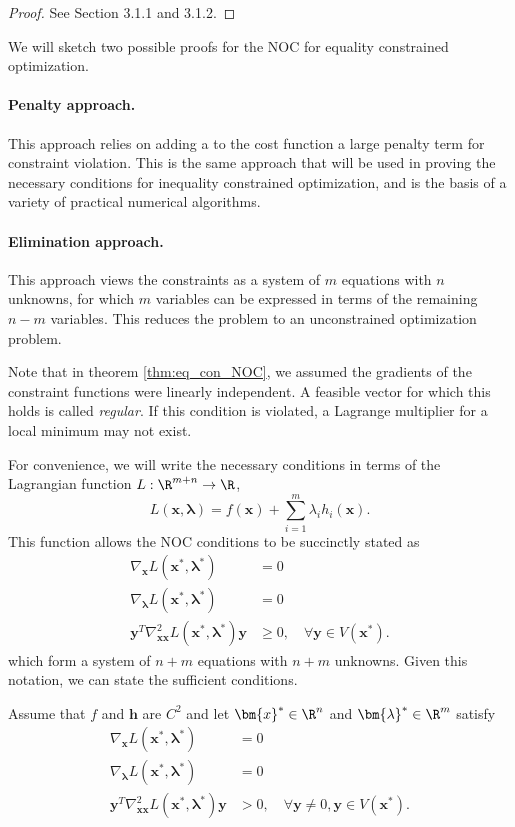 \begin{proof}
See \cite{bertsekas2016nonlinear} Section 3.1.1 and 3.1.2.
\end{proof}

We will sketch two possible proofs for the NOC for equality constrained optimization. 

\paragraph{Penalty approach.} This approach relies on adding a to the cost function a large penalty term for constraint violation. This is the same approach that will be used in proving the necessary conditions for inequality constrained optimization, and is the basis of a variety of practical numerical algorithms. 

\paragraph{Elimination approach.} This approach views the constraints as a system of $m$ equations with $n$ unknowns, for which $m$ variables can be expressed in terms of the remaining $n-m$ variables. This reduces the problem to an unconstrained optimization problem. 

Note that in theorem \ref{thm:eq_con_NOC}, we assumed the gradients of the constraint functions were linearly independent. A feasible vector for which this holds is called \textit{regular}. If this condition is violated, a Lagrange multiplier for a local minimum may not exist. 

For convenience, we will write the necessary conditions in terms of the Lagrangian function $L:\R^{m+n} \to \R$,
\begin{equation}
    L(\bm{x},\bm{\lambda}) = f(\bm{x}) + \sum^m_{i=1} \lambda_i h_i(\bm{x}).
\end{equation}
This function allows the NOC conditions to be succinctly stated as 
\begin{align}
    \nabla_{\bm{x}} L(\bm{x}^*,\bm{\lambda}^*) &= 0\\
    \nabla_{\bm{\lambda}} L(\bm{x}^*,\bm{\lambda}^*) &= 0\\
    \bm{y}^T \nabla^2_{\bm{xx}} L(\bm{x}^*,\bm{\lambda}^*) \bm{y} &\geq 0, \quad \forall \bm{y} \in V(\bm{x}^*).
\end{align}
which form a system of $n+m$ equations with $n+m$ unknowns. Given this notation, we can state the sufficient conditions. 

\begin{theorem}
Assume that $f$ and $\bm{h}$ are $C^2$ and let $\bm{x}^* \in \R^n$ and $\bm{\lambda}^* \in \R^m$ satisfy
\begin{align}
    \nabla_{\bm{x}} L(\bm{x}^*,\bm{\lambda}^*) &= 0\\
    \nabla_{\bm{\lambda}} L(\bm{x}^*,\bm{\lambda}^*) &= 0\\
    \bm{y}^T \nabla^2_{\bm{xx}} L(\bm{x}^*,\bm{\lambda}^*) \bm{y} &> 0, \quad \forall \bm{y} \neq 0, \bm{y} \in V(\bm{x}^*).
\end{align}
\end{theorem}

